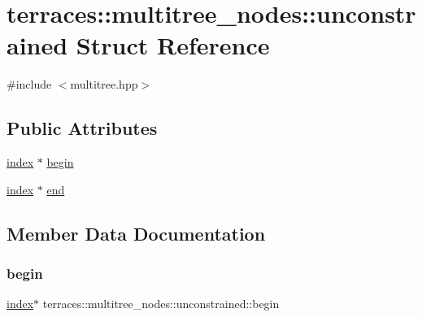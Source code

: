 \hypertarget{structterraces_1_1multitree__nodes_1_1unconstrained}{}\section{terraces\+:\+:multitree\+\_\+nodes\+:\+:unconstrained Struct Reference}
\label{structterraces_1_1multitree__nodes_1_1unconstrained}


{\ttfamily \#include $<$multitree.\+hpp$>$}

\subsection*{Public Attributes}
\begin{DoxyCompactItemize}
\item 
\hyperlink{namespaceterraces_adbc33ccb543d1634e96d0eb02e472c77}{index} $\ast$ \hyperlink{structterraces_1_1multitree__nodes_1_1unconstrained_a682b1bc98947bba76df87c098f87962a}{begin}
\item 
\hyperlink{namespaceterraces_adbc33ccb543d1634e96d0eb02e472c77}{index} $\ast$ \hyperlink{structterraces_1_1multitree__nodes_1_1unconstrained_a09312cac542aacde054f495a914f6cab}{end}
\end{DoxyCompactItemize}


\subsection{Member Data Documentation}
\mbox{\label{structterraces_1_1multitree__nodes_1_1unconstrained_a682b1bc98947bba76df87c098f87962a}} 
\subsubsection{\texorpdfstring{begin}{begin}}
{\footnotesize\ttfamily \hyperlink{namespaceterraces_adbc33ccb543d1634e96d0eb02e472c77}{index}$\ast$ terraces\+::multitree\+\_\+nodes\+::unconstrained\+::begin}

\mbox{\label{structterraces_1_1multitree__nodes_1_1unconstrained_a09312cac542aacde054f495a914f6cab}} 
